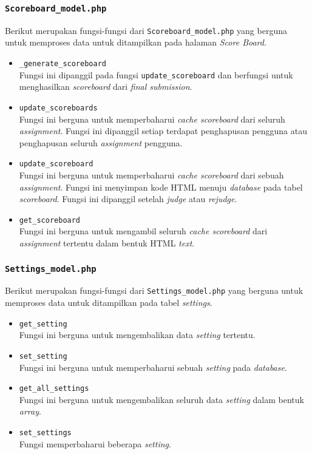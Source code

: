 \subsubsection{\texttt{Scoreboard\_model.php}}
Berikut merupakan fungsi-fungsi dari \texttt{Scoreboard\_model.php} yang berguna untuk memproses data untuk ditampilkan pada halaman \textit{Score Board}.
\begin{itemize}
	\item \texttt{\_generate\_scoreboard}\\
	Fungsi ini dipanggil pada fungsi \texttt{update\_scoreboard} dan berfungsi untuk menghasilkan \textit{scoreboard} dari \textit{final submission}.
	\item \texttt{update\_scoreboards}\\
	Fungsi ini berguna untuk memperbaharui \textit{cache scoreboard} dari seluruh \textit{assignment}. Fungsi ini dipanggil setiap terdapat penghapusan pengguna atau penghapusan seluruh \textit{assignment} pengguna.
	\item \texttt{update\_scoreboard}\\
	Fungsi ini berguna untuk memperbaharui \textit{cache scoreboard} dari sebuah \textit{assignment}. Fungsi ini menyimpan kode HTML menuju \textit{database} pada tabel \textit{scoreboard}. Fungsi ini dipanggil setelah \textit{judge} atau \textit{rejudge}.
	\item \texttt{get\_scoreboard}\\
	Fungsi ini berguna untuk mengambil seluruh \textit{cache scoreboard} dari \textit{assignment} tertentu dalam bentuk HTML \textit{text}.
\end{itemize}
\subsubsection{\texttt{Settings\_model.php}}
Berikut merupakan fungsi-fungsi dari \texttt{Settings\_model.php} yang berguna untuk memproses data untuk ditampilkan pada tabel \textit{settings}.
\begin{itemize}
	\item \texttt{get\_setting}\\
	Fungsi ini berguna untuk mengembalikan data \textit{setting} tertentu.
	\item \texttt{set\_setting}\\
	Fungsi ini berguna untuk memperbaharui sebuah \textit{setting} pada \textit{database}.
	\item \texttt{get\_all\_settings}\\
	Fungsi ini berguna untuk mengembalikan seluruh data \textit{setting} dalam bentuk \textit{array}.
	\item \texttt{set\_settings}\\
	Fungsi memperbaharui beberapa \textit{setting}.
\end{itemize}
